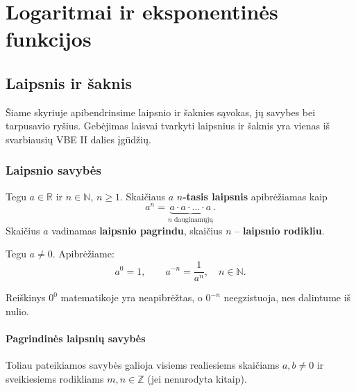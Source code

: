 \chapter{Logaritmai ir eksponentinės funkcijos}

\section{Laipsnis ir šaknis}

Šiame skyriuje apibendrinsime laipsnio ir šaknies sąvokas, jų savybes bei
tarpusavio ryšius. Gebėjimas laisvai tvarkyti laipsnius ir šaknis yra vienas
iš svarbiausių VBE II dalies įgūdžių.

\subsection{Laipsnio savybės}

\begin{definition}
Tegu $a \in \mathbb{R}$ ir $n \in \mathbb{N}$, $n \geq 1$. Skaičiaus $a$
\textbf{$n$-tasis laipsnis} apibrėžiamas kaip
\[
    a^n = \underbrace{a \cdot a \cdot \ldots \cdot a}_{n \text{ dauginamųjų}}.
\]
Skaičius $a$ vadinamas \textbf{laipsnio pagrindu}, skaičius $n$ –
\textbf{laipsnio rodikliu}.
\end{definition}

\begin{definition}
Tegu $a \neq 0$. Apibrėžiame:
\[
    a^0 = 1, \qquad a^{-n} = \frac{1}{a^n}, \quad n \in \mathbb{N}.
\]
\end{definition}

\begin{remark}
Reiškinys $0^0$ matematikoje yra neapibrėžtas, o $0^{-n}$ neegzistuoja, nes
dalintume iš nulio.
\end{remark}

\subsubsection*{Pagrindinės laipsnių savybės}

Toliau pateikiamos savybės galioja visiems realiesiems skaičiams $a, b \neq 0$
ir sveikiesiems rodikliams $m, n \in \mathbb{Z}$ (jei nenurodyta kitaip).

